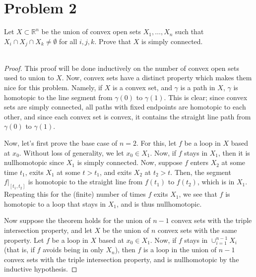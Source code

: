 \documentclass[fontsize=11pt]{scrartcl} %
\numberwithin{equation}{section} %
\numberwithin{figure}{section} %
\numberwithin{table}{section} %
\newcommand{\R}{\mathbb{R}}
\begin{document}
\newpage
\section*{Problem 2}
Let $X\subset \R^n$ be the union of convex open sets $X_1,\dots,X_n$ such that
$X_i\cap X_j\cap X_k\neq\emptyset$ for all $i,j,k$. Prove that $X$ is simply
connected.
\\
\\
\begin{proof}
    This proof will be done inductively on the number of convex open sets used
    to union to $X$. Now, convex sets have a distinct property which makes them
    nice for this problem. Namely, if $X$ is a convex set, and $\gamma$ is a
    path in $X$, $\gamma$ is homotopic to the line segment from $\gamma(0)$ to
    $\gamma(1)$. This is clear; since convex sets are simply connected, all
    paths with fixed endpoints are homotopic to each other, and since each
    convex set is convex, it contains the straight line path from $\gamma(0)$ to
    $\gamma(1)$.

    Now, let's first prove the base case of $n=2$. For this, let $f$ be a loop
    in $X$ based at $x_0$. Without loss of generality, we let $x_0\in X_1$. Now,
    if $f$ stays in $X_1$, then it is nullhomotopic since $X_1$ is simply
    connected. Now, suppose $f$ enters $X_2$ at some time $t_1$, exits $X_1$ at
    some $t>t_1$, and exits $X_2$ at $t_2>t$. Then, the segment $f|_{[t_1,t_2]}$
    is homotopic to the straight line from $f(t_1)$ to $f(t_2)$, which is in
    $X_1$. Repeating this for the (finite) number of times $f$ exits $X_1$, we
    see that $f$ is homotopic to a loop that stays in $X_1$, and is thus
    nullhomotopic.

    Now suppose the theorem holds for the union of $n-1$ convex sets with the
    triple intersection property, and let $X$ be the union of $n$ convex sets
    with the same property. Let $f$ be a loop in $X$ based at $x_0\in X_1$. Now,
    if $f$ stays in $\cup_{i=1}^{n-1}X_i$ (that is, if $f$ avoids being in only
    $X_n$), then $f$ is a loop in the union of $n-1$ convex sets with the triple
    intersection property, and is nullhomotopic by the inductive hypothesis.
    

\end{proof}
\end{document}
